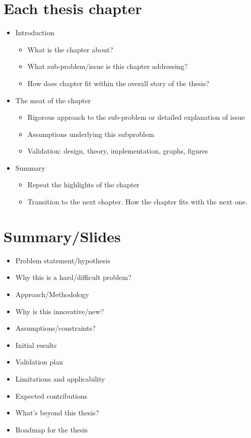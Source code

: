 \section{Each thesis chapter}
\begin{itemize}
    \item Introduction
        \begin{itemize}
            \item What is the chapter about?
            \item What sub-problem/issue is this chapter addressing?
            \item How does chapter fit within the overall story of the thesis?
        \end{itemize}
    \item The meat of the chapter
        \begin{itemize}
            \item Rigorous approach to the sub-problem or detailed explanation of issue
            \item Assumptions underlying this subproblem
            \item Validation: design, theory, implementation, graphs, figures
        \end{itemize}

    \item Summary
        \begin{itemize}
            \item Repeat the highlights of the chapter
            \item Transition to the next chapter. 
                How the chapter fits with the next one.
        \end{itemize}
\end{itemize}

\section{Summary/Slides}
\begin{itemize}
    \item Problem statement/hypothesis
    \item Why this is a hard/difficult problem?
    \item Approach/Methodology
    \item Why is this innovative/new?
    \item Assumptions/constraints?
    \item Initial results
    \item  Validation plan
    \item Limitations and applicability
    \item Expected contributions
    \item What's beyond  this thesis?
    \item Roadmap for the thesis
\end{itemize}

